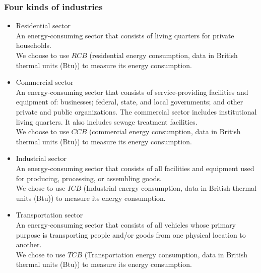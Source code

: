 \documentclass{mcmthesis}
\begin{document}
\subsubsection{Four kinds of industries}
\begin{itemize}
  \item Residential sector\\
  An energy-consuming sector that consists of living quarters for private households.\\
  We choose to use $RCB$ (residential energy consumption, data in British thermal units (Btu)) to measure its energy consumption.
  \item Commercial sector\\
  An energy-consuming sector that consists of service-providing facilities and equipment of: businesses; federal,
  state, and local governments; and other private and public organizations. The commercial sector includes
  institutional living quarters. It also includes sewage treatment facilities.\\
  We choose to use $CCB$ (commercial energy consumption, data in British thermal units (Btu)) to measure its energy consumption.
  \item Industrial sector\\
  An energy-consuming sector that consists of all facilities and equipment used for producing, processing, or assembling goods.\\
  We chose to use $ICB$ (Industrial energy consumption, data in British thermal units (Btu)) to measure its energy consumption.
  \item Transportation sector\\
  An energy-consuming sector that consists of all vehicles whose primary purpose is transporting people and/or
  goods from one physical location to another.\\
  We chose to use $TCB$ (Transportation energy consumption, data in British thermal units (Btu)) to measure its energy consumption.
\end{itemize}
\end{document}
